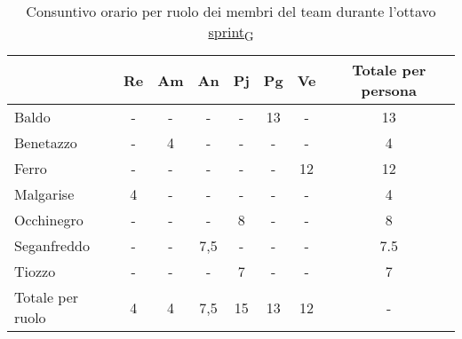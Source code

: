 \begin{table}[!h]
    \centering
    \begin{tabular}{ | l | c | c | c | c | c | c | c | }
        \hline
        \textbf{} & \textbf{Re} & \textbf{Am} &\textbf{An} & \textbf{Pj} & \textbf{Pg} & \textbf{Ve} & \textbf{Totale per persona} \\
        \hline			    %
        Baldo            &  -   &  -   &  -   &  -   & 13   &  -   & 13   \\
		Benetazzo        &  -   &  4   &  -   &  -   &  -   &  -   &  4   \\
		Ferro            &  -   &  -   &  -   &  -   &  -   & 12   & 12   \\
		Malgarise        &  4   &  -   &  -   &  -   &  -   &  -   &  4   \\
		Occhinegro       &  -   &  -   &  -   &  8   &  -   &  -   &  8   \\
		Seganfreddo      &  -   &  -   &  7,5 &  -   &  -   &  -   &  7.5 \\
		Tiozzo           &  -   &  -   &  -   &  7   &  -   &  -   &  7   \\
		\hline
		Totale per ruolo &  4   &  4   &  7,5 & 15   & 13   & 12   &  -   \\
        \hline
    \end{tabular}
    \caption{Consuntivo orario per ruolo dei membri del team durante l'ottavo \href{https://7last.github.io/docs/pb/documentazione-interna/glossario\#sprint}{sprint\textsubscript{G}}}
\end{table}

